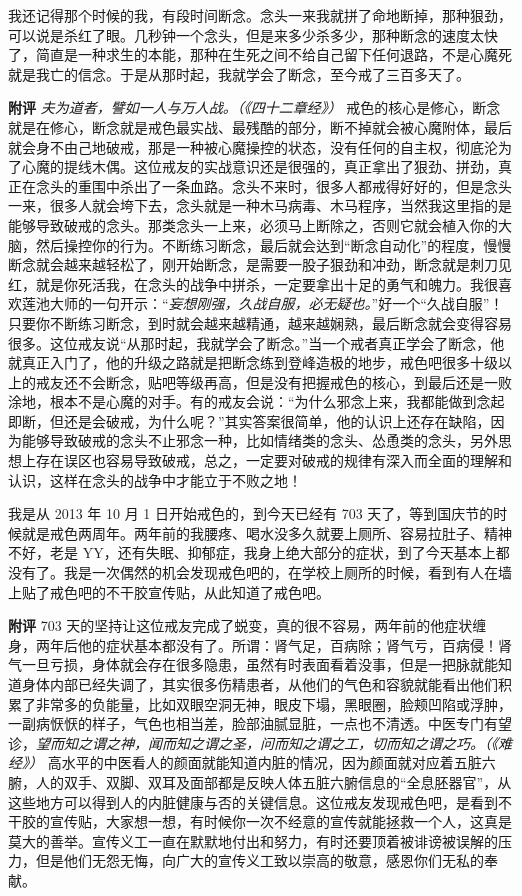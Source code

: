 \begin{case}
    我还记得那个时候的我，有段时间断念。念头一来我就拼了命地断掉，那种狠劲，可以说是杀红了眼。几秒钟一个念头，但是来多少杀多少，那种断念的速度太快了，简直是一种求生的本能，那种在生死之间不给自己留下任何退路，不是心魔死就是我亡的信念。于是从那时起，我就学会了断念，至今戒了三百多天了。

    \textbf{附评} \textit{夫为道者，譬如一人与万人战。（《四十二章经》）} 戒色的核心是修心，断念就是在修心，断念就是戒色最实战、最残酷的部分，断不掉就会被心魔附体，最后就会身不由己地破戒，那是一种被心魔操控的状态，没有任何的自主权，彻底沦为了心魔的提线木偶。这位戒友的实战意识还是很强的，真正拿出了狠劲、拼劲，真正在念头的重围中杀出了一条血路。念头不来时，很多人都戒得好好的，但是念头一来，很多人就会垮下去，念头就是一种木马病毒、木马程序，当然我这里指的是能够导致破戒的念头。那类念头一上来，必须马上断除之，否则它就会植入你的大脑，然后操控你的行为。不断练习断念，最后就会达到“断念自动化”的程度，慢慢断念就会越来越轻松了，刚开始断念，是需要一股子狠劲和冲劲，断念就是刺刀见红，就是你死活我，在念头的战争中拼杀，一定要拿出十足的勇气和魄力。我很喜欢莲池大师的一句开示：“\textit{妄想刚强，久战自服，必无疑也。}”好一个“久战自服”！只要你不断练习断念，到时就会越来越精通，越来越娴熟，最后断念就会变得容易很多。这位戒友说“从那时起，我就学会了断念。”当一个戒者真正学会了断念，他就真正入门了，他的升级之路就是把断念练到登峰造极的地步，戒色吧很多十级以上的戒友还不会断念，贴吧等级再高，但是没有把握戒色的核心，到最后还是一败涂地，根本不是心魔的对手。有的戒友会说：“为什么邪念上来，我都能做到念起即断，但还是会破戒，为什么呢？”其实答案很简单，他的认识上还存在缺陷，因为能够导致破戒的念头不止邪念一种，比如情绪类的念头、怂恿类的念头，另外思想上存在误区也容易导致破戒，总之，一定要对破戒的规律有深入而全面的理解和认识，这样在念头的战争中才能立于不败之地！
\end{case}

\begin{case}
    我是从 2013 年 10 月 1 日开始戒色的，到今天已经有 703 天了，等到国庆节的时候就是戒色两周年。两年前的我腰疼、喝水没多久就要上厕所、容易拉肚子、精神不好，老是 YY，还有失眠、抑郁症，我身上绝大部分的症状，到了今天基本上都没有了。我是一次偶然的机会发现戒色吧的，在学校上厕所的时候，看到有人在墙上贴了戒色吧的不干胶宣传贴，从此知道了戒色吧。

    \textbf{附评} 703 天的坚持让这位戒友完成了蜕变，真的很不容易，两年前的他症状缠身，两年后他的症状基本都没有了。所谓：肾气足，百病除；肾气亏，百病侵！肾气一旦亏损，身体就会存在很多隐患，虽然有时表面看着没事，但是一把脉就能知道身体内部已经失调了，其实很多伤精患者，从他们的气色和容貌就能看出他们积累了非常多的负能量，比如双眼空洞无神，眼皮下塌，黑眼圈，脸颊凹陷或浮肿，一副病恹恹的样子，气色也相当差，脸部油腻显脏，一点也不清透。中医专门有望诊，\textit{望而知之谓之神，闻而知之谓之圣，问而知之谓之工，切而知之谓之巧。（《难经》）} 高水平的中医看人的颜面就能知道内脏的情况，因为颜面就对应着五脏六腑，人的双手、双脚、双耳及面部都是反映人体五脏六腑信息的“全息胚器官”，从这些地方可以得到人的内脏健康与否的关键信息。这位戒友发现戒色吧，是看到不干胶的宣传贴，大家想一想，有时候你一次不经意的宣传就能拯救一个人，这真是莫大的善举。宣传义工一直在默默地付出和努力，有时还要顶着被诽谤被误解的压力，但是他们无怨无悔，向广大的宣传义工致以崇高的敬意，感恩你们无私的奉献。
\end{case}

